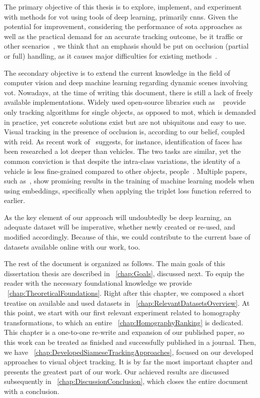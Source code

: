 The primary objective of this thesis is to explore, implement, and experiment with methods for \gls{vot} using tools of deep learning, primarily \glspl{cnn}. Given the potential for improvement, considering the performance of \gls{sota} approaches as well as the practical demand for an accurate tracking outcome, be it traffic or other scenarios~\cite{tang2019cityflow}, we think that an emphasis should be put on occlusion (partial or full) handling, as it causes major difficulties for existing methods~\cite{jiyan2007robustocclusion}.

The secondary objective is to extend the current knowledge in the field of computer vision and deep machine learning regarding dynamic scenes involving \gls{vot}. Nowadays, at the time of writing this document, there is still a lack of freely available implementations. Widely used open-source libraries such as \opencv{}~\cite{bradski2000opencv} provide only tracking algorithms for single objects, as opposed to \gls{mot}, which is demanded in practice, yet concrete solutions exist but are not ubiquitous and easy to use. Visual tracking in the presence of occlusion is, according to our belief, coupled with \gls{reid}. As recent work of~\cite{kuma2019vehiclereid} suggests, for instance, identification of faces has been researched a lot deeper than vehicles. The two tasks are similar, yet the common conviction is that despite the intra-class variations, the identity of a vehicle is less fine-grained compared to other objects, \egtext{} people~\cite{kuma2019vehiclereid}. Multiple papers, such as~\cite{schroff2015facenet, hermans2017triplet}, show promising results in the training of machine learning models when using embeddings, specifically when applying the triplet loss function referred to earlier.

As the key element of our approach will undoubtedly be deep learning, an adequate dataset will be imperative, whether newly created or re-used, and modified accordingly. Because of this, we could contribute to the current base of datasets available online with our work, too.

The rest of the document is organized as follows. The main goals of this dissertation thesis are described in \chaptertext{}~\ref{chap:Goals}, discussed next. To equip the reader with the necessary foundational knowledge we provide \chaptertext{}~\ref{chap:TheoreticalFoundations}. Right after this chapter, we composed a short treatise on available and used datasets in \chaptertext{}~\ref{chap:RelevantDatasetsOverview}. At this point, we start with our first relevant experiment related to homography transformations, to which an entire \chaptertext{}~\ref{chap:HomographyRanking} is dedicated. This chapter is a one-to-one re-write and expansion of our published paper, so this work can be treated as finished and successfully published in a journal. Then, we have \chaptertext{}~\ref{chap:DevelopedSiameseTrackingApproaches}, focused on our developed approaches to visual object tracking. It is by far the most important chapter and presents the greatest part of our work. Our achieved results are discussed subsequently in \chaptertext{}~\ref{chap:DiscussionConclusion}, which closes the entire document with a conclusion.